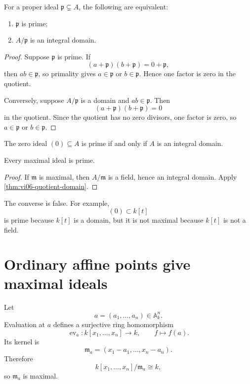 \begin{theorem}
\label{thm:vi06-quotient-domain}
For a proper ideal \(\mathfrak p\subsetneq A\), the following are equivalent:
\begin{enumerate}
  \item \(\mathfrak p\) is prime;
  \item \(A/\mathfrak p\) is an integral domain.
\end{enumerate}
\end{theorem}

\begin{proof}
Suppose \(\mathfrak p\) is prime.  If
\[
(a+\mathfrak p)(b+\mathfrak p)=0+\mathfrak p,
\]
then \(ab\in\mathfrak p\), so primality gives \(a\in\mathfrak p\) or
\(b\in\mathfrak p\).  Hence one factor is zero in the quotient.

Conversely, suppose \(A/\mathfrak p\) is a domain and \(ab\in\mathfrak p\).  Then
\[
(a+\mathfrak p)(b+\mathfrak p)=0
\]
in the quotient.  Since the quotient has no zero divisors, one factor is zero, so
\(a\in\mathfrak p\) or \(b\in\mathfrak p\).
\end{proof}

\begin{corollary}
\label{cor:vi06-zero-prime}
The zero ideal \((0)\subseteq A\) is prime if and only if \(A\) is an integral domain.
\end{corollary}

\begin{corollary}
\label{cor:vi06-maximal-prime}
Every maximal ideal is prime.
\end{corollary}

\begin{proof}
If \(\mathfrak m\) is maximal, then \(A/\mathfrak m\) is a field, hence an integral
domain.  Apply \cref{thm:vi06-quotient-domain}.
\end{proof}

The converse is false.  For example,
\[
(0)\subset k[t]
\]
is prime because \(k[t]\) is a domain, but it is not maximal because \(k[t]\) is not a
field.

\section{Ordinary affine points give maximal ideals}

Let
\[
a=(a_1,\dots,a_n)\in\mathbb A_k^n.
\]
Evaluation at \(a\) defines a surjective ring homomorphism
\[
\operatorname{ev}_a:k[x_1,\dots,x_n]\longrightarrow k,
\qquad
f\longmapsto f(a).
\]
Its kernel is
\[
\mathfrak m_a=(x_1-a_1,\dots,x_n-a_n).
\]
Therefore
\[
k[x_1,\dots,x_n]/\mathfrak m_a\cong k,
\]
so \(\mathfrak m_a\) is maximal.

